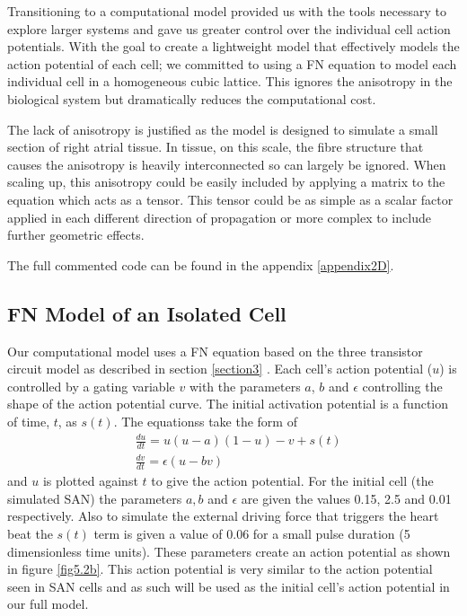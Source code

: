 Transitioning to a computational model provided us with the tools necessary to explore larger systems and gave us greater control over the individual cell action potentials. With the goal to create a lightweight model that effectively models the action potential of each cell; we committed to using a FN equation to model each individual cell in a homogeneous cubic lattice. This ignores the anisotropy in the biological system but dramatically reduces the computational cost. \par

The lack of anisotropy is justified as the model is designed to simulate a small section of right atrial tissue. In tissue, on this scale, the fibre structure that causes the anisotropy is heavily interconnected so can largely be ignored. When scaling up, this anisotropy could be easily included by applying a matrix to the equation which acts as a tensor. This tensor could be as simple as a scalar factor applied in each different direction of propagation or more complex to include further geometric effects. \par
The full commented code can be found in the appendix \ref{appendix2D}.

\subsection{FN Model of an Isolated Cell}
\label{sectionisocell}
Our computational model uses a FN equation based on the three transistor circuit model as described in section \ref{section3} \citep{3transistor}. Each cell's action potential ($u$) is controlled by a gating variable $v$ with the parameters $a$, $b$ and $\epsilon$ controlling the shape of the action potential curve. The initial activation potential is a function of time, $t$, as $s(t)$. The equationss take the form of
\begin{equation}
    \begin{split}
        & \frac{du}{dt}=u(u-a)(1-u)-v+s(t) \\
        & \frac{dv}{dt}=\epsilon (u-bv)
    \end{split}
    \label{eqmodel}
\end{equation}
and $u$ is plotted against $t$ to give the action potential. For the initial cell (the simulated SAN) the parameters $a, b$ and $\epsilon$ are given the values 0.15, 2.5 and 0.01 respectively. Also to simulate the external driving force that triggers the heart beat the $s(t)$ term is given a value of 0.06 for a small pulse duration (5 dimensionless time units). These parameters create an action potential as shown in figure \ref{fig5.2b}. This action potential is very similar to the action potential seen in SAN cells and as such will be used as the initial cell's action potential in our full model. \par

